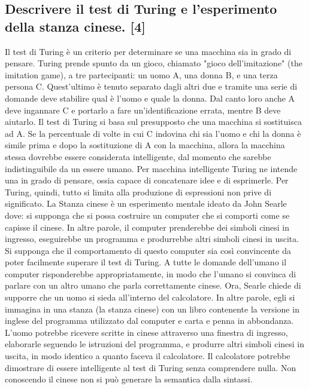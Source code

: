 \documentclass[\main/main.tex]{subfiles}
\begin{document}
\subsection{Descrivere il test di Turing e l'esperimento della stanza cinese. [4]}
Il test di Turing è un criterio per determinare se una macchina sia in grado di pensare. Turing prende spunto da un gioco, chiamato "gioco dell'imitazione" (the imitation game), a tre partecipanti: un uomo A, una donna B, e una terza persona C. Quest'ultimo è tenuto separato dagli altri due e tramite una serie di domande deve stabilire qual è l'uomo e quale la donna. Dal canto loro anche A deve ingannare C e portarlo a fare un'identificazione errata, mentre B deve aiutarlo.
Il test di Turing si basa sul presupposto che una macchina si sostituisca ad A. Se la percentuale di volte in cui C indovina chi sia l'uomo e chi la donna è simile prima e dopo la sostituzione di A con la macchina, allora la macchina stessa dovrebbe essere considerata intelligente, dal momento che sarebbe indistinguibile da un essere umano.
Per macchina intelligente Turing ne intende una in grado di pensare, ossia capace di concatenare idee e di esprimerle. Per Turing, quindi, tutto si limita alla produzione di espressioni non prive di significato.
La Stanza cinese è un esperimento mentale ideato da John Searle dove: si supponga che si possa costruire un computer che si comporti come se capisse il cinese. In altre parole, il computer prenderebbe dei simboli cinesi in ingresso, eseguirebbe un programma e produrrebbe altri simboli cinesi in uscita. Si supponga che il comportamento di questo computer sia così convincente da poter facilmente superare il test di Turing. A tutte le domande dell'umano il computer risponderebbe appropriatamente, in modo che l'umano si convinca di parlare con un altro umano che parla correttamente cinese.
Ora, Searle chiede di supporre che un uomo si sieda all'interno del calcolatore. In altre parole, egli si immagina in una stanza (la stanza cinese) con un libro contenente la versione in inglese del programma utilizzato dal computer e carta e penna in abbondanza. L'uomo potrebbe ricevere scritte in cinese attraverso una finestra di ingresso, elaborarle seguendo le istruzioni del programma, e produrre altri simboli cinesi in uscita, in modo identico a quanto faceva il calcolatore.
Il calcolatore potrebbe dimostrare di essere intelligente al test di Turing senza comprendere nulla. Non conoscendo il cinese non si può generare la semantica dalla sintassi.
\end{document}
